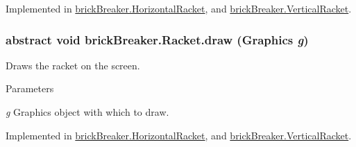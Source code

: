 Implemented in \hyperlink{classbrick_breaker_1_1_horizontal_racket_a183d1d47f35fad74e603534ec74fbdb9}{brickBreaker.HorizontalRacket}, and \hyperlink{classbrick_breaker_1_1_vertical_racket_ac9edcb855d560fa5771da4e12abb4e71}{brickBreaker.VerticalRacket}.

\hypertarget{classbrick_breaker_1_1_racket_a6ca0308def67e0955522a0e0beb430e9}{
\subsubsection[{draw}]{\setlength{\rightskip}{0pt plus 5cm}abstract void brickBreaker.Racket.draw (Graphics {\em g})}}
\label{classbrick_breaker_1_1_racket_a6ca0308def67e0955522a0e0beb430e9}
Draws the racket on the screen. 
\begin{DoxyParams}{Parameters}
\item[{\em g}]Graphics object with which to draw. \end{DoxyParams}


Implemented in \hyperlink{classbrick_breaker_1_1_horizontal_racket_a8d97c411da71162acd5ecbb32c333f8d}{brickBreaker.HorizontalRacket}, and \hyperlink{classbrick_breaker_1_1_vertical_racket_ac455ce02602cbf621997042439809ee5}{brickBreaker.VerticalRacket}.

